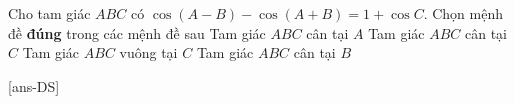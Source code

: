 \begin{ex}%
	Cho tam giác $ABC$ có $\cos(A-B)-\cos(A+B)=1+\cos C$. Chọn mệnh đề \textbf{đúng} trong các mệnh đề sau
	\choice
	{Tam giác $ABC$ cân tại $A$}
	{\True Tam giác $ABC$ cân tại $C$}
	{Tam giác $ABC$ vuông tại $C$}
	{Tam giác $ABC$ cân tại $B$}
\end{ex}


\cauds

[ans-DS]


